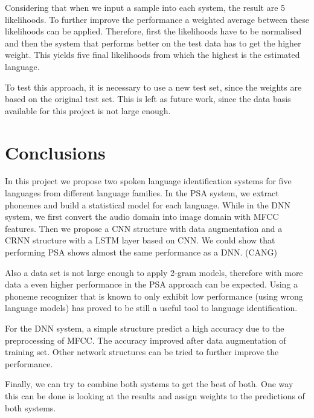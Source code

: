 \documentclass{article}
\begin{document}
Considering that when we input a sample into each system, the result are 5 likelihoods. To further improve the performance a weighted average between these likelihoods can be applied. Therefore, first the likelihoods have to be normalised and then the system that performs better on the test data has to get the higher weight. This yields five final likelihoods from which the highest is the estimated language.

To test this approach, it is necessary to use a new test set, since the weights are based on the original test set. This is left as future work, since the data basis available for this project is not large enough.

\section{Conclusions}
\label{sec:conclusion}

In this project we propose two spoken language identification systems for five languages from different language families. In the PSA system, we extract phonemes and build a statistical model for each language. While in the DNN system, we first convert the audio domain into image domain with MFCC features. Then we propose a CNN structure with data augmentation and a CRNN structure with a LSTM layer based on CNN. 
We could show that performing PSA shows almost the same performance as a DNN. (CANG)

Also a data set is not large enough to apply 2-gram models, therefore with more data a even higher performance in the PSA approach can be expected. Using a phoneme recognizer that is known to only exhibit low performance (using wrong language models) has proved to be still a useful tool to language identification.

For the DNN system, a simple structure predict a high accuracy due to the preprocessing of MFCC. The accuracy improved after data augmentation of training set. Other network structures can be tried to further improve the performance.

Finally, we can try to combine both systems to get the best of both. One way this can be done is looking at the results and assign weights to the predictions of both systems.




\end{document}
